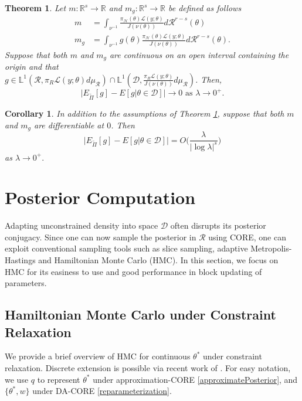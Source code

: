 \documentclass[10pt,fleqn]{article}
\newtheorem{theorem}{Theorem}
\newtheorem{corollary}{Corollary}
\newcommand{\mc}[1]{\mathcal{#1}}
\DeclareMathOperator{\1}{\mathbbm{1}}
\begin{document}
{\begin{theorem}
\label{THM:Relaxed_Expectation_Convergence_Measure_Zero}
Let $m:\mathbb{R}^s\to \mathbb{R}$ and $m_g:\mathbb{R}^s\to \mathbb{R}$ be defined as follows
\begin{align*}
m &= \int_{\nu^{-1}} \frac{\pi_\mathcal{H}(\theta) \mathcal{L}(y;\theta)}{J(\nu(\theta))} d\mathcal{R}^{r-s}(\theta) \\
m_g &= \int_{\nu^{-1}} g(\theta)\frac{\pi_\mathcal{H}(\theta) \mathcal{L}(y;\theta)}{J(\nu(\theta))} d\mathcal{R}^{r-s}(\theta).
\end{align*}
Suppose that both $m$ and $m_g$ are continuous on an open interval containing the origin and that \\ $g\in\mathbb{L}^1(\mathcal{R},\pi_R\mathcal{L}(y;\theta)d\mu_\mathcal{R}) \cap\mathbb{L}^1(\mathcal{D},\frac{\pi_R\mathcal{L}(y;\theta)}{J(\nu(\theta))}d\mu_\mathcal{R})$. Then,
$$\bigg|E_{\tilde{\Pi}}[g] - E[g|\theta \in \mathcal{D}]\bigg| \to 0 \text{ as } \lambda\to 0^+.$$
\end{theorem}

\begin{corollary}
In addition to the assumptions of Theorem \ref{THM:Relaxed_Expectation_Convergence_Measure_Zero}, suppose that both $m$ and $m_g$ are differentiable at $0$. Then
$$\bigg|E_{\tilde{\Pi}}[g] - E[g|\theta \in \mathcal{D}] \bigg| = O\bigg(\frac{\lambda}{|\log \lambda|^s}\bigg)$$
as $\lambda \to 0^+.$
\end{corollary}

}
 
\section{Posterior Computation}

Adapting  unconstrained density into space $\mc D$ often disrupts its posterior conjugacy. Since one can now sample the posterior in $\mc R$ using
 CORE, one can exploit conventional sampling tools such as slice sampling, adaptive Metropolis-Hastings and Hamiltonian Monte Carlo (HMC). In this section, we focus on HMC for its easiness to use and good performance in block updating of parameters.

\subsection{Hamiltonian Monte Carlo under Constraint Relaxation}

We provide a brief overview of HMC for continuous $\theta^*$ under constraint relaxation. Discrete extension is possible via recent work of \cite{nishimura2017discontinuous}. For easy notation, we use $q$ to represent $\theta^*$ under approximation-CORE \eqref{approximatePosterior}, and $\{\theta^*, w\}$ under DA-CORE \eqref{reparameterization}.
\end{document}
